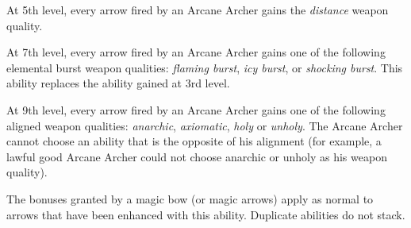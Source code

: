 At 5th level, every arrow fired by an Arcane Archer gains the \emph{distance} weapon quality.

At 7th level, every arrow fired by an Arcane Archer gains one of the following elemental burst weapon qualities: \emph{flaming burst}, \emph{icy burst}, or \emph{shocking burst}. This ability replaces the ability gained at 3rd level.

At 9th level, every arrow fired by an Arcane Archer gains one of the following aligned weapon qualities: \emph{anarchic}, \emph{axiomatic}, \emph{holy} or \emph{unholy}. The Arcane Archer cannot choose an ability that is the opposite of his alignment (for example, a lawful good Arcane Archer could not choose anarchic or unholy as his weapon quality).

The bonuses granted by a magic bow (or magic arrows) apply as normal to arrows that have been enhanced with this ability. Duplicate abilities do not stack.





